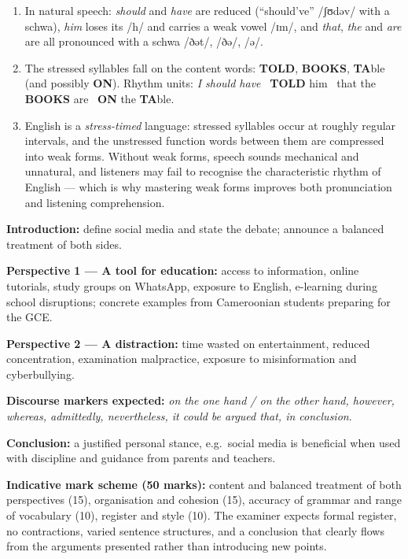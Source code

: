 \documentclass[11pt]{article}
\newcounter{popsec}
\newcounter{popsub}
\newcommand{\courssub}[1]{%
  \stepcounter{popsub}%
  \par\vspace{9pt}\noindent{\popxbold\fontsize{11.5}{13}\selectfont\color{popink}{\color{poporange}\thepopsec.\thepopsub}\hspace{6pt}#1}\par\nopagebreak\vspace{4pt}
}
\begin{document}
\begin{corrige}
\begin{enumerate}
\item In natural speech: \emph{should} and \emph{have} are reduced (``should've'' /ʃʊdəv/ with a schwa), \emph{him} loses its /h/ and carries a weak vowel /ɪm/, and \emph{that}, \emph{the} and \emph{are} are all pronounced with a schwa /ðət/, /ðə/, /ə/.
\item The stressed syllables fall on the content words: \textbf{TOLD}, \textbf{BOOKS}, \textbf{TA}ble (and possibly \textbf{ON}). Rhythm units: \emph{I should have} \textbar\ \textbf{TOLD} him \textbar\ that the \textbf{BOOKS} are \textbar\ \textbf{ON} the \textbf{TA}ble.
\item English is a \emph{stress-timed} language: stressed syllables occur at roughly regular intervals, and the unstressed function words between them are compressed into weak forms. Without weak forms, speech sounds mechanical and unnatural, and listeners may fail to recognise the characteristic rhythm of English --- which is why mastering weak forms improves both pronunciation and listening comprehension.
\end{enumerate}
\end{corrige}

\courssub{I prepare for the GCE}

\begin{corrige}
\textbf{Introduction:} define social media and state the debate; announce a balanced treatment of both sides.\par
\textbf{Perspective 1 --- A tool for education:} access to information, online tutorials, study groups on WhatsApp, exposure to English, e-learning during school disruptions; concrete examples from Cameroonian students preparing for the GCE.\par
\textbf{Perspective 2 --- A distraction:} time wasted on entertainment, reduced concentration, examination malpractice, exposure to misinformation and cyberbullying.\par
\textbf{Discourse markers expected:} \emph{on the one hand / on the other hand, however, whereas, admittedly, nevertheless, it could be argued that, in conclusion}.\par
\textbf{Conclusion:} a justified personal stance, e.g.\ social media is beneficial when used with discipline and guidance from parents and teachers.\par
\textbf{Indicative mark scheme (50 marks):} content and balanced treatment of both perspectives (15), organisation and cohesion (15), accuracy of grammar and range of vocabulary (10), register and style (10). The examiner expects formal register, no contractions, varied sentence structures, and a conclusion that clearly flows from the arguments presented rather than introducing new points.
\end{corrige}
\end{document}
